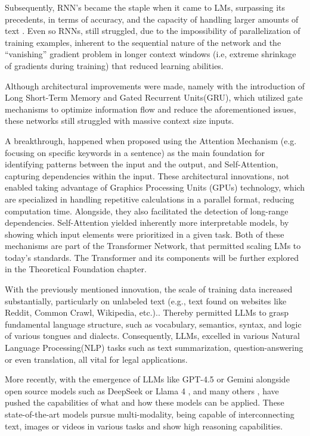 \documentclass[11pt,a4paper,twoside,openright]{book}
\begin{document}
\par Subsequently, RNN's became the staple when it came to LMs, surpassing its precedents, in terms of accuracy, and the capacity of handling larger amounts of text \parencite{mikolov_recurrent_2010}. Even so RNNs, still struggled, due to the impossibility of parallelization of training examples, inherent to the sequential nature of the network and the  “vanishing” gradient problem in longer context windows (i.e, extreme shrinkage of gradients during training) that reduced learning abilities.

Although architectural improvements were made, namely with the introduction of Long Short-Term Memory and Gated Recurrent Units(GRU), which utilized gate mechanisms to optimize information flow and reduce the aforementioned issues, these networks still struggled with massive context size inputs.

\par A breakthrough, happened when \textcite{vaswani_attention_2023} proposed using the Attention Mechanism (e.g. focusing on specific keywords in a sentence) as the main foundation for identifying patterns between the input and the output, and Self-Attention, capturing dependencies within the input. These architectural innovations, not enabled taking advantage of Graphics Processing Units (GPUs) technology, which are specialized in handling repetitive calculations in a parallel format, reducing computation time. Alongside, they also facilitated the detection of long-range dependencies.
Self-Attention yielded inherently more interpretable models, by showing which input elements were prioritized in a given task. Both of these mechanisms are part of the Transformer Network, that permitted scaling LMs to today's standards. The Transformer and its components will be further explored in the Theoretical Foundation chapter.

\par With the previously mentioned innovation, the scale of training data increased substantially, particularly on unlabeled text (e.g., text found on websites like Reddit, Common Crawl, Wikipedia, etc.).\parencite{wang_history_llms_2024}. Thereby permitted LLMs to grasp fundamental language structure, such as vocabulary, semantics, syntax, and logic of various tongues and dialects. Consequently, LLMs, excelled in various Natural Language Processing(NLP) tasks such as text summarization, question-answering or even translation, all vital for legal applications.

\par More recently, with the emergence of LLMs like GPT-4.5 \parencite{openai2025gpt45} or Gemini \parencite{team_gemini_2025} alongside open source models such as DeepSeek \parencite{deepseek-ai_deepseek-r1_2025} or Llama 4 \parencite{meta2025llama4}, and many others \parencite{shukla_Most_advanced_models_2025}, have pushed the capabilities of what and how these models can be applied. These state-of-the-art models pursue multi-modality, being capable of interconnecting text, images or videos in various tasks and show high reasoning capabilities.
\end{document}
